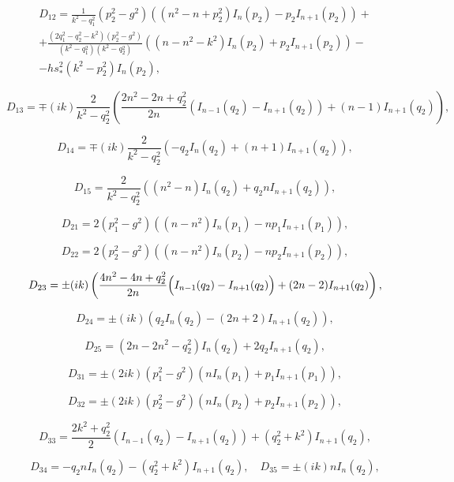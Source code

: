 \begin{multline*}

D_{12}=\frac{1}{k^{2}-q_{1}^{2}}(p_{2}^{2}-g^{2})\left((n^{2}-n+p_{2}^{2})I_{n}(p_{2})-p_{2}I_{n+1}(p_{2})

\right)+\\ +

\frac{(2q_{1}^{2}-q_{2}^{2}-k^{2})(p_{2}^{2}-g^{2})}{(k^{2}-q_{1}^{2})(k^{2}-q_{2}^{2})}

\left((n-n^{2}-k^{2})I_{n}(p_{2})+p_{2}I_{n+1}(p_{2})\right)-\\

-hs_{*}^{2}(k^{2}-p_{2}^{2})I_{n}(p_{2}),

\end{multline*}

$$

D_{13}=\mp(ik)\frac{2}{k^{2}-q_{2}^{2}}\left({\displaystyle\frac{2n^{2}-2n+q_{2}^{2}}{2n}\left(I_{n-1}(q_{2})-I_{n+1}(q_{2})\right)+(n-1)I_{n+1}(q_{2})}\right),$$

$$

D_{14}=\mp(ik)\frac{2}{k^{2}-q_{2}^{2}}\left({-q_{2}I_{n}(q_{2})+(n+1)I_{n+1}(q_{2})}\right),$$

$$D_{15}=\frac{2}{k^{2}-q_{2}^{2}}\left({(n^{2}-n)I_{n}(q_{2})+q_{2}n I_{n+1}(q_{2})}\right),

$$

$$D_{21}=2(p_{1}^{2}-g^{2})\left({(n-n^{2})I_{n}(p_{1})-np_{1}I_{n+1}(p_{1})}\right),$$

$$D_{22}=2(p_{2}^{2}-g^{2})\left({(n-n^{2})I_{n}(p_{2})-np_{2}I_{n+1}(p_{2})}\right),$$

$$D_{23}=\pm(ik)\left({\displaystyle\frac{4n^{2}-4n+q_{2}^{2}}{2n}\Bigl(I_{n-1}(q_{2})-I_{n+1}(q_{2})\Bigr)+(2n-2)I_{n+1}(q_{2})}\right),$$

$$D_{24}=\pm(ik)\left({q_{2}I_{n}(q_{2})-(2n+2)I_{n+1}(q_{2})}\right),$$

$$D_{25}=(2n-2n^{2}-q_{2}^{2})I_{n}(q_{2})+2q_{2}I_{n+1}(q_{2}),$$


$$D_{31}=\pm(2ik)(p_{1}^{2}-g^{2})\left({nI_{n}(p_{1})+p_{1}I_{n+1}(p_{1})}\right),$$

$$D_{32}=\pm(2ik)(p_{2}^{2}-g^{2})\left({nI_{n}(p_{2})+p_{2}I_{n+1}(p_{2})}\right),$$

$$D_{33}=\displaystyle \frac{2k^{2}+q_{2}^{2}}{2}\left(I_{n-1}(q_{2})-I_{n+1}(q_{2})\right)+(q_{2}^{2}+k^{2})I_{n+1}(q_{2}),$$

$$D_{34}=-q_{2}nI_{n}(q_{2})-(q_{2}^{2}+k^{2})I_{n+1}(q_{2}),\quad D_{35}=\pm(ik)nI_{n}(q_{2}),$$

